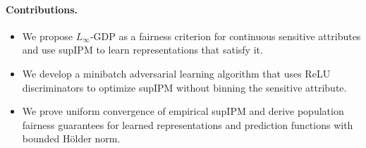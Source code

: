 \documentclass{article} %
\begin{document}
\paragraph{Contributions.}
\begin{itemize}
  \item We propose $L_{\infty}$-GDP as a fairness criterion for continuous sensitive attributes and use supIPM to learn representations that satisfy it.
  \item We develop a minibatch adversarial learning algorithm that uses ReLU discriminators to optimize supIPM without binning the sensitive attribute.
  \item We prove uniform convergence of empirical supIPM and derive population fairness guarantees for learned representations and prediction functions with bounded H\"older norm.
\end{itemize}



\end{document}
